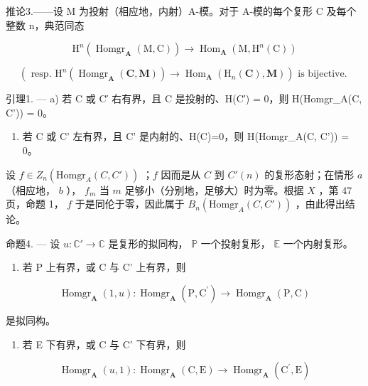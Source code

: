 推论3.——设 M 为投射（相应地，内射）A-模。对于 A-模的每个复形 C 及每个整数 n，典范同态

\[
\mathrm{H} ^ {n} (\operatorname{Homgr} _ {\mathbf {A}} (\mathrm{M}, \mathrm{C})) \rightarrow \operatorname{Hom} _ {\mathbf {A}} (\mathrm{M}, \mathrm{H} ^ {n} (\mathrm{C}))
\]

\[
\left(\text { resp. } \mathrm{H} ^ {n} (\operatorname{Homgr} _ {\mathbf {A}} (\mathbf {C}, \mathbf {M})) \rightarrow \operatorname{Hom} _ {\mathbf {A}} \left(\mathrm{H} _ {n} (\mathbf {C}), \mathbf {M}\right)\right) \text { is   bijective. }
\]

引理1. --- a) 若 C 或 C′ 右有界，且 C 是投射的、H(C′) = 0，则 H(Homgr\_A(C, C')) = 0。

\begin{enumerate}
\def\labelenumi{\alph{enumi})}
\setcounter{enumi}{1}
\tightlist
\item
  若 C 或 C' 左有界，且 C' 是内射的、H(C)=0，则 H(Homgr\_A(C, C')) = 0。
\end{enumerate}

设 \(f \in Z_n(\text{Homgr}_A(C, C'))\) ；\(f\) 因而是从 \(C\) 到 \(C'(n)\) 的复形态射；在情形 \(a\) （相应地， \(b\) ）， \(f_m\) 当 \(m\) 足够小（分别地，足够大）时为零。根据 \(X\) ，第 47 页，命题 1， \(f\) 于是同伦于零，因此属于 \(B_n(\text{Homgr}_A(C, C'))\) ，由此得出结论。

命题4. --- 设 \(u: \mathbb{C}' \to \mathbb{C}\) 是复形的拟同构， \(\mathbb{P}\) 一个投射复形， \(\mathbb{E}\) 一个内射复形。

\begin{enumerate}
\def\labelenumi{\alph{enumi})}
\tightlist
\item
  若 P 上有界，或 C 与 C' 上有界，则
\end{enumerate}

\[
\operatorname{Homgr} _ {\mathbf {A}} (1, u): \operatorname{Homgr} _ {\mathbf {A}} (\mathrm{P}, \mathrm{C} ^ {\prime}) \rightarrow \operatorname{Homgr} _ {\mathbf {A}} (\mathrm{P}, \mathrm{C})
\]

是拟同构。

\begin{enumerate}
\def\labelenumi{\alph{enumi})}
\setcounter{enumi}{1}
\tightlist
\item
  若 E 下有界，或 C 与 C' 下有界，则
\end{enumerate}

\[
\operatorname{Homgr} _ {\mathbf {A}} (u, 1): \operatorname{Homgr} _ {\mathbf {A}} (\mathrm{C}, \mathrm{E}) \rightarrow \operatorname{Homgr} _ {\mathbf {A}} (\mathrm{C} ^ {\prime}, \mathrm{E})
\]

